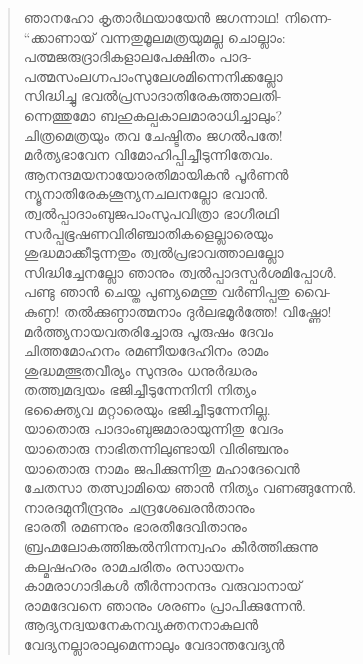 \begin{verse}
ഞാനഹോ കൃതാര്‍ഥയായേന്‍ ജഗന്നാഥ! നിന്നെ-\\
“ക്കാണായ് വന്നതുമൂലമത്രയുമല്ല ചൊല്ലാം:\\
പത്മജരുദ്രാദികളാലപേക്ഷിതം പാദ-\\
പത്മസംലഗ്നപാംസുലേശമിന്നെനിക്കല്ലോ\\
സിദ്ധിച്ചു ഭവല്‍പ്രസാദാതിരേകത്താലതി-\\
ന്നെത്തുമോ ബഹുകല്പകാലമാരാധിച്ചാലും?\\
ചിത്രമെത്രയും തവ ചേഷ്ടിതം ജഗല്‍പതേ!\\
മര്‍ത്യഭാവേന വിമോഹിപ്പിച്ചീടുന്നിതേവം.\\
ആനന്ദമയനായോരതിമായികന്‍ പൂര്‍ണന്‍\\
ന്യൂനാതിരേകശൂന്യനചലനല്ലോ ഭവാന്‍.\\
ത്വല്‍പ്പാദാംബുജപാംസുപവിത്രാ ഭാഗീരഥി\\
സര്‍പ്പഭൂഷണവിരിഞ്ചാതികളെല്ലാരെയും\\
ശുദ്ധമാക്കീടുന്നതും ത്വല്‍പ്രഭാവത്താലല്ലോ\\
സിദ്ധിച്ചേനല്ലോ ഞാനും ത്വല്‍പ്പാദസ്പര്‍ശമിപ്പോള്‍.\\
പണ്ടു ഞാന്‍ ചെയ്ത പുണ്യമെന്തു വര്‍ണിപ്പതു വൈ-\\
കുണ്ഠ! തല്‍ക്കുണ്ഠാത്മനാം ദുര്‍ലഭമൂര്‍ത്തേ! വിഷ്ണോ!\\
മര്‍ത്ത്യനായവതരിച്ചോരു പൂരുഷം ദേവം\\
ചിത്തമോഹനം രമണീയദേഹിനം രാമം\\
ശുദ്ധമത്ഭുതവീര്യം സുന്ദരം ധനുര്‍ദ്ധരം\\
തത്ത്വമദ്വയം ഭജിച്ചീടുന്നേനിനി നിത്യം\\
ഭക്ത്യൈവ മറ്റാരെയും ഭജിച്ചീടുന്നേനില്ല.\\
യാതൊരു പാദാംബുജമാരായുന്നിതു വേദം\\
യാതൊരു നാഭിതന്നിലുണ്ടായി വിരിഞ്ചനും\\
യാതൊരു നാമം ജപിക്കുന്നിതു മഹാദേവെന്‍\\
ചേതസാ തത്സ്വാമിയെ ഞാന്‍ നിത്യം \hbox{വണങ്ങുന്നേന്‍.}\\
നാരദമുനീന്ദ്രനും ചന്ദ്രശേഖരന്‍താനും\\
ഭാരതീ രമണനും ഭാരതീദേവിതാനും\\
ബ്രഹ്മലോകത്തിങ്കല്‍നിന്നന്വഹം കീര്‍ത്തിക്കുന്നു\\
കല്മഷഹരം രാമചരിതം രസായനം\\
കാമരാഗാദികള്‍ തീര്‍ന്നാനന്ദം വരുവാനായ്\\
രാമദേവനെ ഞാനും ശരണം പ്രാപിക്കുന്നേന്‍.\\
ആദ്യനദ്വയനേകനവ്യക്തനനാകുലന്‍\\
വേദ്യനല്ലാരാലുമെന്നാലും വേദാന്തവേദ്യന്‍\\

\end{verse}
